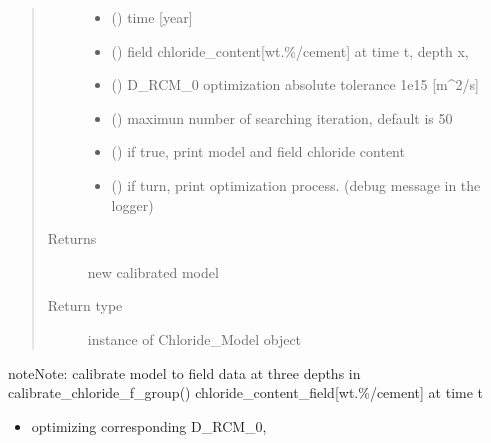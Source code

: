 \documentclass[letterpaper,10pt,english]{sphinxmanual}
\begin{document}
\begin{fulllineitems}
\begin{quote}
\begin{description}
\begin{itemize}
\item {} 
\sphinxAtStartPar
{} () \textendash{} time {[}year{]}

\item {} 
\sphinxAtStartPar
{} () \textendash{} field chloride\_content{[}wt.\sphinxhyphen{}\%/cement{]} at time t, depth x,

\item {} 
\sphinxAtStartPar
{} () \textendash{} D\_RCM\_0 optimization absolute tolerance 1e\sphinxhyphen{}15 {[}m\textasciicircum{}2/s{]}

\item {} 
\sphinxAtStartPar
{} () \textendash{} maximun number of searching iteration, default is 50

\item {} 
\sphinxAtStartPar
{} () \textendash{} if true, print model and field chloride content

\item {} 
\sphinxAtStartPar
{} () \textendash{} if turn, print optimization process. (debug message in the logger)

\end{itemize}

\item[{Returns}] \leavevmode
\sphinxAtStartPar
new calibrated model

\item[{Return type}] \leavevmode
\sphinxAtStartPar
instance of Chloride\_Model object

\end{description}\end{quote}

\begin{sphinxadmonition}{note}{Note:}
\sphinxAtStartPar
calibrate model to field data at three depths in calibrate\_chloride\_f\_group()
chloride\_content\_field{[}wt.\sphinxhyphen{}\%/cement{]} at time t
\begin{itemize}
\item {} 
\sphinxAtStartPar
optimizing corresponding D\_RCM\_0,


\end{itemize}
\end{sphinxadmonition}
\end{fulllineitems}
\end{document}
